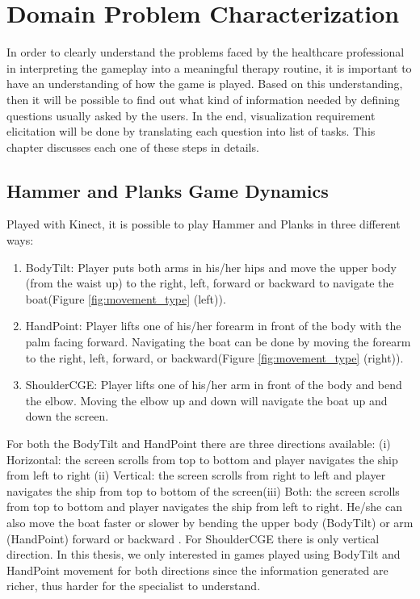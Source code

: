\chapter{Domain Problem Characterization}
\label{chap:problem}

In order to clearly understand the problems faced by the healthcare professional in interpreting the gameplay into a meaningful therapy routine, it is important to have an understanding of how the game is played. Based on this understanding, then it will be possible to find out what kind of information needed by defining questions usually asked by the users. In the end, visualization requirement elicitation will be done by translating each question into list of tasks. This chapter discusses each one of these steps in details.

\section{Hammer and Planks Game Dynamics}

Played with Kinect, it is possible to play Hammer and Planks in three different ways:
\begin{enumerate}
  \item BodyTilt:
  Player puts both arms in his/her hips and move the upper body (from the waist up) to the right, left, forward or backward to navigate the boat(Figure \ref{fig:movement_type} (left)). 
  \item HandPoint:
  Player lifts one of his/her forearm in front of the body with the palm facing forward. Navigating the boat can be done by moving the forearm to the right, left, forward, or backward(Figure \ref{fig:movement_type} (right)).
  \item ShoulderCGE:
  Player lifts one of his/her arm in front of the body and bend the elbow. Moving the elbow up and down will navigate the boat up and down the screen.
\end{enumerate}

For both the BodyTilt and HandPoint there are three directions available: (i) Horizontal: the screen scrolls from top to bottom and player navigates the ship from left to right (ii) Vertical: the screen scrolls from right to left and player navigates the ship from top to bottom of the screen(iii) Both: the screen scrolls from top to bottom and player navigates the ship from left to right. He/she can also move the boat faster or slower by bending the upper body (BodyTilt) or arm (HandPoint) forward or backward . For ShoulderCGE there is only vertical direction. In this thesis, we only interested in games played using BodyTilt and HandPoint movement for both directions since the information generated are richer, thus harder for the specialist to understand.


